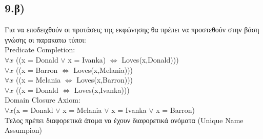 \documentclass[12pt,a4paper]{article}
\begin{document}
\subsection*{9.β)}
Για να εποδειχθούν οι προτάσεις της εκφώνησης θα πρέπει να προστεθούν στην βάση γνώσης οι παρακατω τύποι:\vspace{3mm}\\
\textlatin{Predicate Completion:}\vspace{1mm}\\
\textlatin{$\forall x$ ((x = Donald $\vee$ x = Ivanka) $\Leftrightarrow$ Loves(x,Donald)))}\\
\textlatin{$\forall x$ ((x = Barron $\Leftrightarrow$ Loves(x,Melania)))}\\
\textlatin{$\forall x$ ((x = Melania $\Leftrightarrow$ Loves(x,Barron)))}\\
\textlatin{$\forall x$ ((x = Donald $\Leftrightarrow$ Loves(x,Ivanka)))}\vspace{3mm}\\
\textlatin{Domain Closure Axiom:}\vspace{1mm}\\
\textlatin{$\forall x$(x = Donald $\vee$ x = Melania $\vee$ x = Ivanka  $\vee$ x = Barron)}\vspace{3mm}\\
Τελος πρέπει διαφορετικά άτομα να έχουν διαφορετικά ονόματα (\textlatin{Unique Name Assumpion})
\end{document}
